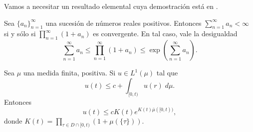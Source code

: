 Vamos a necesitar un resultado elemental cuya demostración está en \cite[Teorema 8.1.1]{limits}.
\begin{thm}\label{limits}
	Sea $\{a_n\}_{n=1}^\infty$ una sucesión de números reales positivos. Entonces $\displaystyle\sum_{n=1}^{\infty}a_n<\infty$ si y sólo si $\displaystyle\prod_{n=1}^\infty(1+a_n)$ es convergente.  En tal caso, vale la desigualdad
	\begin{equation*}
	\sum_{n=1}^{\infty}a_n\leq \prod_{n=1}^\infty(1+a_n) \leq \exp\left(\sum_{n=1}^{\infty}a_n \right). 
	\end{equation*}
\end{thm}
 

\begin{thm} \label{TG} 	Sea $\mu$ una medida finita, positiva. Si $u\in L^1(\mu) $ tal que 
	\begin{equation*}
		u(t)\leq c+\int_{[0,t)}u(r) \; d\mu.
	\end{equation*} Entonces 
\begin{equation*}
	u(t)\leq c K(t)e^{K(t)\bar{\mu}([0,t))},
\end{equation*}
donde $K(t)=\displaystyle\prod_{\tau\in D\cap[0,t)}\left( 1+\mu(\{\tau\})\right) $.

\end{thm}



